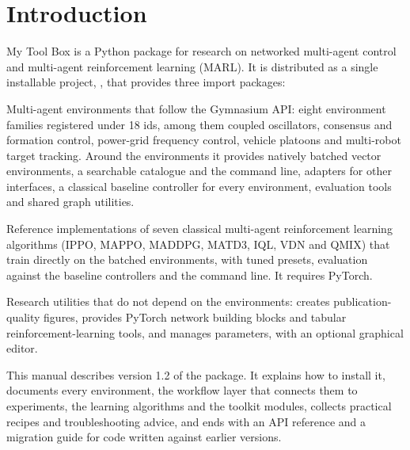 \chapter{Introduction}\label{chap:intro}
\begingroup\setlength{\emergencystretch}{3em}%

My Tool Box is a Python package for research on networked multi-agent control
and multi-agent reinforcement learning (MARL). It is distributed as a single
installable project, , that provides three import packages:

\begin{description}[leftmargin=1.6cm,style=nextline]
  \item[\pkg{env\_lib}] Multi-agent environments that follow the Gymnasium
    API: eight environment families registered under 18 ids, among them
    coupled oscillators, consensus and formation control, power-grid
    frequency control, vehicle platoons and multi-robot target tracking.
    Around the environments it provides natively batched vector
    environments, a searchable catalogue and the  command line,
    adapters for other interfaces, a classical baseline controller for every
    environment, evaluation tools and shared graph utilities.
  \item[\pkg{marl\_algorithms}] Reference implementations of seven classical
    multi-agent reinforcement learning algorithms (IPPO, MAPPO, MADDPG,
    MATD3, IQL, VDN and QMIX) that train directly on the batched
     environments, with tuned presets, evaluation against the
    baseline controllers and the  command line. It requires
    PyTorch.
  \item[\pkg{toolkit}] Research utilities that do not depend on the
    environments:  creates publication-quality figures,
     provides PyTorch network building blocks and
    tabular reinforcement-learning tools, and  manages
     parameters, with an optional graphical editor.
\end{description}

This manual describes version 1.2 of the package. It explains how to install
it, documents every environment, the workflow layer that connects them to
experiments, the learning algorithms and the toolkit modules, collects practical recipes and troubleshooting
advice, and ends with an API reference and a migration guide for code written
against earlier versions.


